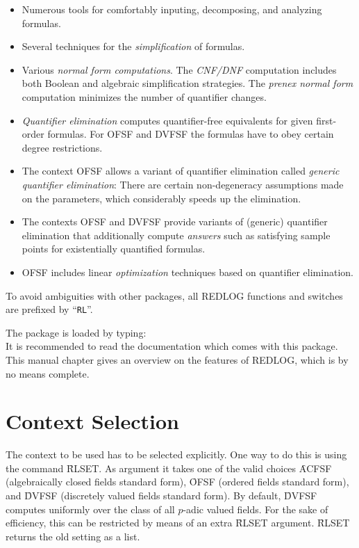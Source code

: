 \begin{itemize}
\item
Numerous tools for comfortably inputing, decomposing, and analyzing
formulas.
\item
Several techniques for the \emph{simplification} of formulas.
\item
Various \emph{normal form computations}. The
\emph{\textsc{CNF}/\textsc{DNF}} computation includes both Boolean and
algebraic simplification strategies. The \emph{prenex normal form}
computation minimizes the number of quantifier changes.
\item
\emph{Quantifier elimination} computes quantifier-free equivalents for
given first-order formulas. For \textsc{OFSF} and \textsc{DVFSF} the
formulas have to obey certain degree restrictions.
\item 
The context \textsc{OFSF} allows a variant of quantifier elimination
called \emph{generic quantifier elimination}: There are certain
non-degeneracy assumptions made on the parameters, which considerably
speeds up the elimination.
\item
The contexts \textsc{OFSF} and \textsc{DVFSF} provide variants of
(generic) quantifier elimination that additionally compute
\emph{answers} such as satisfying sample points for existentially
quantified formulas.
\item
\textsc{OFSF}
includes linear \emph{optimization} techniques based on quantifier
elimination.
\end{itemize}

To avoid ambiguities with other packages, all \textsc{REDLOG} functions and
switches are prefixed by ``\texttt{RL}''.

The package is loaded by typing:  \\

It is recommended to read the documentation which comes with this
package. This manual chapter gives an overview on the features of
\textsc{REDLOG}, which is by no means complete.


\section{Context Selection}
The context to be used has to be selected explicitly. One way 
to do this is using the command \f{RLSET}. As argument it takes one 
of the
valid choices \f{ACFSF} (algebraically closed fields
standard form),
\f{OFSF} (ordered fields standard form), and 
\f{DVFSF}
(discretely valued fields standard form). By default, \f{DVFSF} 
computes
uniformly over the class of all $p$-adic valued fields. For the sake
of efficiency, this can be restricted by means of an extra 
\f{RLSET} argument.
\f{RLSET} returns the old setting as a list.

